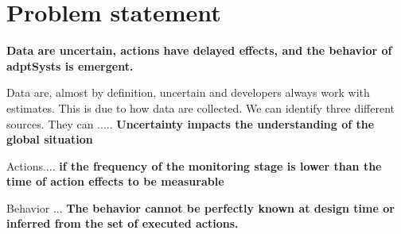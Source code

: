 \section{Problem statement}

\textbf{Data are uncertain, actions have delayed effects, and the behavior of \glspl{adptSyst} is emergent.}

Data are, almost by definition, uncertain and developers always work with estimates.
This is due to how data are collected.
We can identify three different sources.
They can .....
\textbf{Uncertainty impacts the understanding of the global situation}

Actions....
\textbf{if the frequency of the monitoring stage is lower than the time of action effects to be measurable}


Behavior ...
\textbf{The behavior cannot be perfectly known at design time or inferred from the set of executed actions.}
